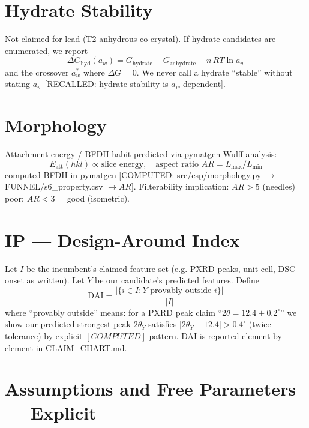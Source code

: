\documentclass[11pt,a4paper]{article}
\begin{document}
\section{Hydrate Stability}

Not claimed for lead (T2 anhydrous co-crystal). If hydrate candidates are enumerated, we report
\begin{equation}
\Delta G_{\mathrm{hyd}}(a_w) = G_{\mathrm{hydrate}} - G_{\mathrm{anhydrate}} - n\,RT\ln a_w
\end{equation}
and the crossover $a_w^*$ where $\Delta G=0$. We never call a hydrate ``stable'' without stating $a_w$ [RECALLED: hydrate stability is $a_w$-dependent].

\section{Morphology}

Attachment-energy / BFDH habit predicted via pymatgen Wulff analysis:
\begin{equation}
E_{\mathrm{att}}(hkl) \propto \text{slice energy}, \quad \text{aspect ratio } AR = L_{\max}/L_{\min}
\end{equation}
computed BFDH in pymatgen [COMPUTED: src/csp/morphology.py $\to$ FUNNEL/s6\_property.csv $\to AR$]. Filterability implication: $AR>5$ (needles) = poor; $AR<3$ = good (isometric).

\section{IP — Design-Around Index}

Let $I$ be the incumbent's claimed feature set (e.g. PXRD peaks, unit cell, DSC onset as written). Let $Y$ be our candidate's predicted features. Define
\begin{equation}
\mathrm{DAI} = \frac{|\{i\in I: Y \text{ provably outside } i\}|}{|I|}
\end{equation}
where ``provably outside'' means: for a PXRD peak claim ``$2\theta = 12.4\pm0.2^\circ$'' we show our predicted strongest peak $2\theta_Y$ satisfies $|2\theta_Y-12.4|>0.4^\circ$ (twice tolerance) by explicit $[COMPUTED]$ pattern. DAI is reported element-by-element in CLAIM\_CHART.md.

\section{Assumptions and Free Parameters — Explicit}
\end{document}
